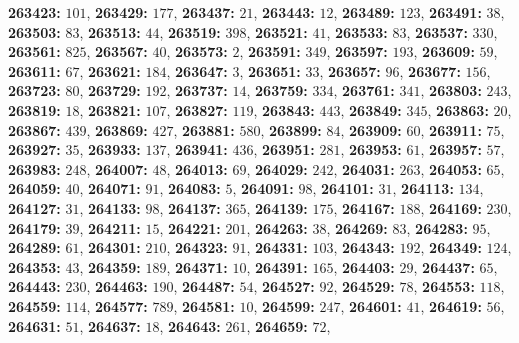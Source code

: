 \textsf{\bfseries 263423:} $101$, \textsf{\bfseries 263429:} $177$, \textsf{\bfseries 263437:} $21$, \textsf{\bfseries 263443:} $12$, \textsf{\bfseries 263489:} $123$, \textsf{\bfseries 263491:} $38$, \textsf{\bfseries 263503:} $83$, \textsf{\bfseries 263513:} $44$, \textsf{\bfseries 263519:} $398$, \textsf{\bfseries 263521:} $41$, \textsf{\bfseries 263533:} $83$, \textsf{\bfseries 263537:} $330$, \textsf{\bfseries 263561:} $825$, \textsf{\bfseries 263567:} $40$, \textsf{\bfseries 263573:} $2$, \textsf{\bfseries 263591:} $349$, \textsf{\bfseries 263597:} $193$, \textsf{\bfseries 263609:} $59$, \textsf{\bfseries 263611:} $67$, \textsf{\bfseries 263621:} $184$, \textsf{\bfseries 263647:} $3$, \textsf{\bfseries 263651:} $33$, \textsf{\bfseries 263657:} $96$, \textsf{\bfseries 263677:} $156$, \textsf{\bfseries 263723:} $80$, \textsf{\bfseries 263729:} $192$, \textsf{\bfseries 263737:} $14$, \textsf{\bfseries 263759:} $334$, \textsf{\bfseries 263761:} $341$, \textsf{\bfseries 263803:} $243$, \textsf{\bfseries 263819:} $18$, \textsf{\bfseries 263821:} $107$, \textsf{\bfseries 263827:} $119$, \textsf{\bfseries 263843:} $443$, \textsf{\bfseries 263849:} $345$, \textsf{\bfseries 263863:} $20$, \textsf{\bfseries 263867:} $439$, \textsf{\bfseries 263869:} $427$, \textsf{\bfseries 263881:} $580$, \textsf{\bfseries 263899:} $84$, \textsf{\bfseries 263909:} $60$, \textsf{\bfseries 263911:} $75$, \textsf{\bfseries 263927:} $35$, \textsf{\bfseries 263933:} $137$, \textsf{\bfseries 263941:} $436$, \textsf{\bfseries 263951:} $281$, \textsf{\bfseries 263953:} $61$, \textsf{\bfseries 263957:} $57$, \textsf{\bfseries 263983:} $248$, \textsf{\bfseries 264007:} $48$, \textsf{\bfseries 264013:} $69$, \textsf{\bfseries 264029:} $242$, \textsf{\bfseries 264031:} $263$, \textsf{\bfseries 264053:} $65$, \textsf{\bfseries 264059:} $40$, \textsf{\bfseries 264071:} $91$, \textsf{\bfseries 264083:} $5$, \textsf{\bfseries 264091:} $98$, \textsf{\bfseries 264101:} $31$, \textsf{\bfseries 264113:} $134$, \textsf{\bfseries 264127:} $31$, \textsf{\bfseries 264133:} $98$, \textsf{\bfseries 264137:} $365$, \textsf{\bfseries 264139:} $175$, \textsf{\bfseries 264167:} $188$, \textsf{\bfseries 264169:} $230$, \textsf{\bfseries 264179:} $39$, \textsf{\bfseries 264211:} $15$, \textsf{\bfseries 264221:} $201$, \textsf{\bfseries 264263:} $38$, \textsf{\bfseries 264269:} $83$, \textsf{\bfseries 264283:} $95$, \textsf{\bfseries 264289:} $61$, \textsf{\bfseries 264301:} $210$, \textsf{\bfseries 264323:} $91$, \textsf{\bfseries 264331:} $103$, \textsf{\bfseries 264343:} $192$, \textsf{\bfseries 264349:} $124$, \textsf{\bfseries 264353:} $43$, \textsf{\bfseries 264359:} $189$, \textsf{\bfseries 264371:} $10$, \textsf{\bfseries 264391:} $165$, \textsf{\bfseries 264403:} $29$, \textsf{\bfseries 264437:} $65$, \textsf{\bfseries 264443:} $230$, \textsf{\bfseries 264463:} $190$, \textsf{\bfseries 264487:} $54$, \textsf{\bfseries 264527:} $92$, \textsf{\bfseries 264529:} $78$, \textsf{\bfseries 264553:} $118$, \textsf{\bfseries 264559:} $114$, \textsf{\bfseries 264577:} $789$, \textsf{\bfseries 264581:} $10$, \textsf{\bfseries 264599:} $247$, \textsf{\bfseries 264601:} $41$, \textsf{\bfseries 264619:} $56$, \textsf{\bfseries 264631:} $51$, \textsf{\bfseries 264637:} $18$, \textsf{\bfseries 264643:} $261$, \textsf{\bfseries 264659:} $72$, 
